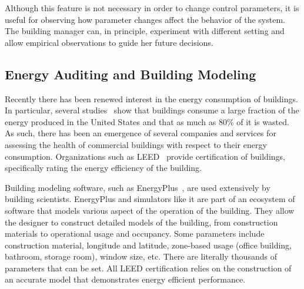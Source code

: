 Although this feature is not necessary in order to change control parameters, it is useful for observing how parameter changes
affect the behavior of the system.  The building manager can, in principle, experiment with different setting and allow
empirical observations to guide her future decisions.



\subsection{Energy Auditing and Building Modeling}
\label{sec:elensvision}
Recently there has been renewed interest in the energy consumption of buildings.  In particular, several studies~\cite{BuildingEnergyData,
waste_science} show that buildings consume a large fraction of the energy produced in the United States and that as much
as 80\% of it is wasted\cite{waste_science, next10_waste}.  As such, there has been an emergence of several companies and 
services for assessing the health of
commercial buildings with respect to their energy consumption.  Organizations such as LEED~\cite{Leed} provide certification of 
buildings, specifically rating the energy efficiency of the building.

Building modeling software, such as EnergyPlus~\cite{eplus}, are used extensively by building scientists. 
EnergyPlus and simulators like it are part of an ecosystem of software that models various aspect of the operation
of the building.  They allow the designer to construct detailed models of the building, from construction materials to 
operational usage and occupancy.  Some parameters include
construction material, longitude and latitude, zone-based usage (office building, bathroom, storage room), window size, etc.  
There are literally thousands of parameters that can be set.  All LEED certification relies on the construction of an 
accurate model that demonstrates energy efficient performance.

